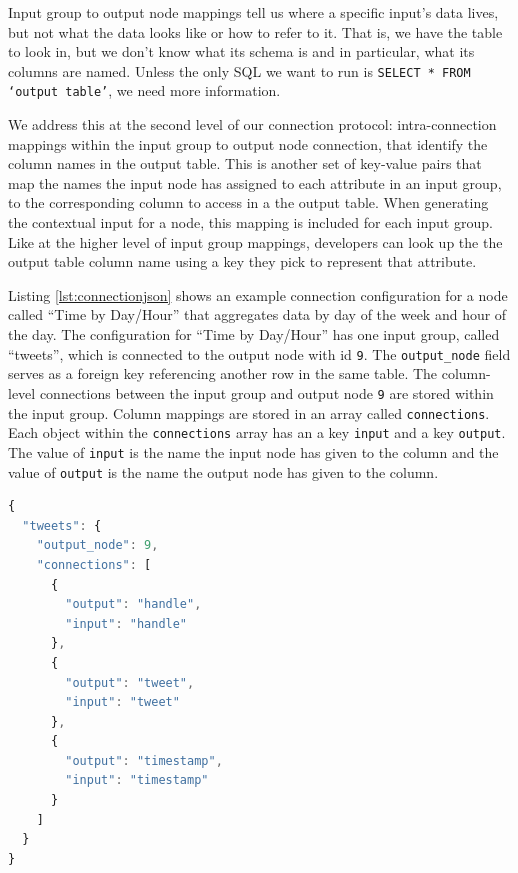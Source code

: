 \documentclass[midd]{thesis}
\begin{document}
Input group to output node mappings tell us where a specific input's data lives,
but not what the data looks like or how to refer to it. That is, we have the
table to look in, but we don't know what its schema is and in particular, what
its columns are named. Unless the only SQL we want to run is \texttt{SELECT *
FROM `output table'}, we need more information.

We address this at the second level of our connection protocol: intra-connection
mappings within the input group to output node connection, that identify the
column names in the output table. This is another set of key-value pairs that
map the names the input node has assigned to each attribute in an input group,
to the corresponding column to access in a the output table. When generating the
contextual input for a node, this mapping is included for each input group. Like
at the higher level of input group mappings, developers can look up the the
output table column name using a key they pick to represent that attribute.

Listing \ref{lst:connectionjson} shows an example connection configuration for a
node called ``Time by Day/Hour'' that aggregates data by day of the week and
hour of the day. The configuration for ``Time by Day/Hour'' has one input group,
called ``tweets'', which is connected to the output node with id \texttt{9}. The
\texttt{output\_node} field serves as a foreign key referencing another row in
the same table. The column-level connections between the input group and output
node \texttt{9} are stored within the input group. Column mappings are stored in
an array called \texttt{connections}. Each object within the
\texttt{connections} array has an a key \texttt{input} and a key
\texttt{output}. The value of \texttt{input} is the name the input node has
given to the column and the value of \texttt{output} is the name the output node
has given to the column.

\begin{lstlisting}[language=javascript, caption={A node's connection configuration. The node has a connection from its input group ``tweets'' to the node with id 9.}, captionpos=b, label={lst:connectionjson}]
{
  "tweets": {
    "output_node": 9,
    "connections": [
      {
        "output": "handle",
        "input": "handle"
      },
      {
        "output": "tweet",
        "input": "tweet"
      },
      {
        "output": "timestamp",
        "input": "timestamp"
      }
    ]
  }
}
\end{lstlisting}
\end{document}
